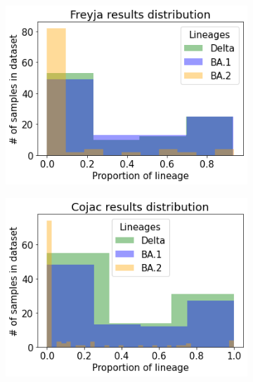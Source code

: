         \begin{figure}[H]
            \centering
            \begin{subfigure}[b]{0.45\textwidth}
            \includegraphics[width=1\textwidth]{figures/results/mock/distr-freyja.png}
            \label{fig:results:mock:dist-freyja-all}
            \end{subfigure}
            \hfill
            \begin{subfigure}[b]{0.45\textwidth}
            \includegraphics[width=1\textwidth]{figures/results/mock/distr-cojac.png}
            \label{fig:results:mock:dist-cojac-all}
            \end{subfigure}
        \end{figure}
        
